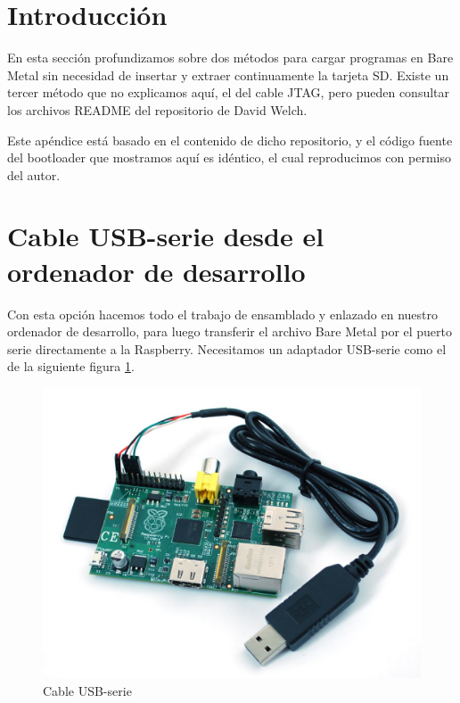 \pagestyle{fancy}
\fancyhead[LE,RO]{\thepage}
\fancyhead[LO]{\nouppercase{\rightmark}}

\label{chp:SerieBoot}
\minitoc

\section{Introducción}

En esta sección profundizamos sobre dos métodos para cargar programas en Bare Metal sin
necesidad de insertar y extraer continuamente la tarjeta SD. Existe un tercer método que
no explicamos aquí, el del cable JTAG, pero pueden consultar los archivos
README del repositorio de David Welch\cite{DWEL}.

Este apéndice está basado en el contenido de dicho repositorio, y el código fuente del
bootloader que mostramos aquí es idéntico, el cual reproducimos con permiso del autor.

\section{Cable USB-serie desde el ordenador de desarrollo}

Con esta opción hacemos todo el trabajo de ensamblado y enlazado en nuestro ordenador
de desarrollo, para luego transferir el archivo Bare Metal por el puerto serie
directamente a la Raspberry. Necesitamos un adaptador USB-serie como el de la siguiente
figura \ref{fig:cableusb}.

\begin{figure}[h]
  \centering
    \includegraphics[width=14cm]{graphs/ARM_RaspberryPi_serial.jpg}
  \caption{Cable USB-serie}
  \label{fig:cableusb}
\end{figure}

